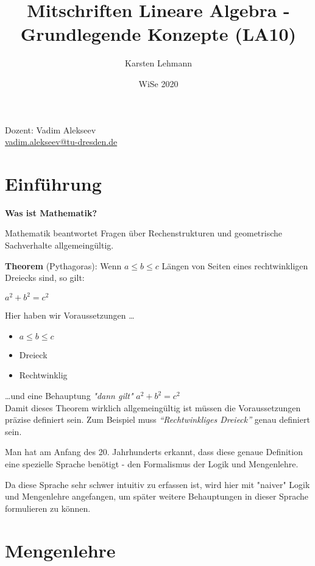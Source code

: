 \documentclass{article}
\author{Karsten Lehmann}
\date{WiSe 2020}
\title{Mitschriften Lineare Algebra - Grundlegende Konzepte (LA10)}
\begin{document}
\maketitle

\vfill
\begin{center}
  Dozent: Vadim Alekseev \\
  \href{mailto:vadim.alekseev@tu-dresden.de}{vadim.alekseev@tu-dresden.de}
\end{center}

\newpage

\section*{Einführung}

\textbf{Was ist Mathematik?}

Mathematik beantwortet Fragen über Rechenstrukturen und geometrische Sachverhalte allgemeingültig.

\textbf{Theorem} (Pythagoras):
Wenn $a \leq b \leq c$ Längen von Seiten eines rechtwinkligen Dreiecks sind, so gilt:

\begin{center}
$a^2 + b^2 = c^2$
\end{center}

Hier haben wir Voraussetzungen \ldots
\begin{itemize}
\item $a \leq b \leq c$
\item Dreieck
\item Rechtwinklig
\end{itemize}

\ldots und eine Behauptung \emph{"dann gilt"} $a^2 + b^2 = c^2$ \\


Damit dieses Theorem wirklich allgemeingültig ist müssen die Voraussetzungen präzise definiert sein.
Zum Beispiel muss \emph{``Rechtwinkliges Dreieck''} genau definiert sein.

Man hat am Anfang des 20. Jahrhunderts erkannt, dass diese genaue Definition eine spezielle Sprache
benötigt - den Formalismus der Logik und Mengenlehre.

Da diese Sprache sehr schwer intuitiv zu erfassen ist, wird hier mit "naiver" Logik und Mengenlehre
angefangen, um später weitere Behauptungen in dieser Sprache formulieren zu können.

\section{Mengenlehre}
\end{document}

